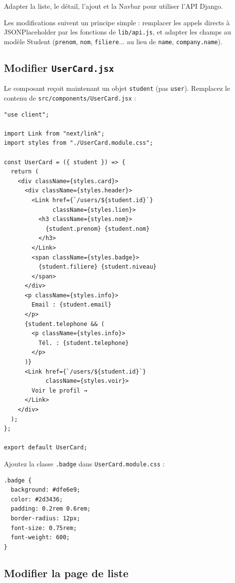 \documentclass[11pt,a4paper]{article}
\begin{document}
\begin{objectifbox}
Adapter la liste, le détail, l'ajout et la Navbar pour utiliser l'API Django.
\end{objectifbox}

Les modifications suivent un principe simple : remplacer les appels directs à JSONPlaceholder par les fonctions de \texttt{lib/api.js}, et adapter les champs au modèle Student (\texttt{prenom}, \texttt{nom}, \texttt{filiere}... au lieu de \texttt{name}, \texttt{company.name}).

\subsection{Modifier \texttt{UserCard.jsx}}

Le composant reçoit maintenant un objet \texttt{student} (pas \texttt{user}). Remplacez le contenu de \texttt{src/components/UserCard.jsx} :

\begin{lstlisting}
"use client";

import Link from "next/link";
import styles from "./UserCard.module.css";

const UserCard = ({ student }) => {
  return (
    <div className={styles.card}>
      <div className={styles.header}>
        <Link href={`/users/${student.id}`}
              className={styles.lien}>
          <h3 className={styles.nom}>
            {student.prenom} {student.nom}
          </h3>
        </Link>
        <span className={styles.badge}>
          {student.filiere} {student.niveau}
        </span>
      </div>
      <p className={styles.info}>
        Email : {student.email}
      </p>
      {student.telephone && (
        <p className={styles.info}>
          Tél. : {student.telephone}
        </p>
      )}
      <Link href={`/users/${student.id}`}
            className={styles.voir}>
        Voir le profil →
      </Link>
    </div>
  );
};

export default UserCard;
\end{lstlisting}

Ajoutez la classe \texttt{.badge} dans \texttt{UserCard.module.css} :

\begin{lstlisting}[style=terminal]
.badge {
  background: #dfe6e9;
  color: #2d3436;
  padding: 0.2rem 0.6rem;
  border-radius: 12px;
  font-size: 0.75rem;
  font-weight: 600;
}
\end{lstlisting}

\subsection{Modifier la page de liste}
\end{document}
